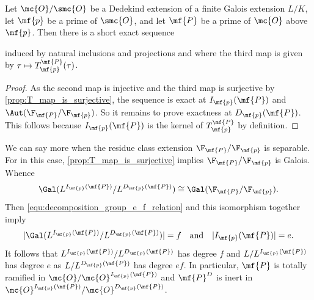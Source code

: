 \documentclass[12pt]{article}
\begin{document}
      \begin{proposition}\label{prop:inertia_group_exact_sequence}
        Let \(\mc{O}/\smc{O}\) be a Dedekind extension of a finite Galois extension \(L/K\), let \(\mf{p}\) be a prime of \(\smc{O}\), and let \(\mf{P}\) be a prime of \(\mc{O}\) above \(\mf{p}\). Then there is a short exact sequence
        \begin{center}
        \end{center}
        induced by natural inclusions and projections and where the third map is given by \(\tau \mapsto T_{\mf{p}}^{\mf{P}}(\tau)\).
      \end{proposition}
      \begin{proof}
        As the second map is injective and the third map is surjective by \cref{prop:T_map_is_surjective}, the sequence is exact at \(I_{\mf{p}}(\mf{P})\) and \(\Aut(\F_{\mf{P}}/\F_{\mf{p}})\). So it remains to prove exactness at \(D_{\mf{p}}(\mf{P})\). This follows because \(I_{\mf{p}}(\mf{P})\) is the kernel of \(T_{\mf{p}}^{\mf{P}}\) by definition.
      \end{proof}

      We can say more when the residue class extension \(\F_{\mf{P}}/\F_{\mf{p}}\) is separable. For in this case, \cref{prop:T_map_is_surjective} implies \(\F_{\mf{P}}/\F_{\mf{p}}\) is Galois. Whence
      \[
        \Gal(L^{I_{\mf{p}}(\mf{P})}/L^{D_{\mf{p}}(\mf{P})}) \cong \Gal(\F_{\mf{P}}/\F_{\mf{p}}).
      \]
      Then \cref{equ:decomposition_group_e_f_relation} and this isomorphism together imply 
      \[
        |\Gal(L^{I_{\mf{p}}(\mf{P})}/L^{D_{\mf{p}}(\mf{P})})| = f \quad \text{and} \quad |I_{\mf{p}}(\mf{P})| = e.
      \]
      It follows that \(L^{I_{\mf{p}}(\mf{P})}/L^{D_{\mf{p}}(\mf{P})}\) has degree \(f\) and \(L/L^{I_{\mf{p}}(\mf{P})}\) has degree \(e\) as \(L/L^{D_{\mf{p}}(\mf{P})}\) has degree \(ef\). In particular, \(\mf{P}\) is totally ramified in \(\mc{O}/\mc{O}^{I_{\mf{p}}(\mf{P})}\) and \(\mf{P}^{D}\) is inert in \(\mc{O}^{I_{\mf{p}}(\mf{P})}/\mc{O}^{D_{\mf{p}}(\mf{P})}\).
\end{document}
